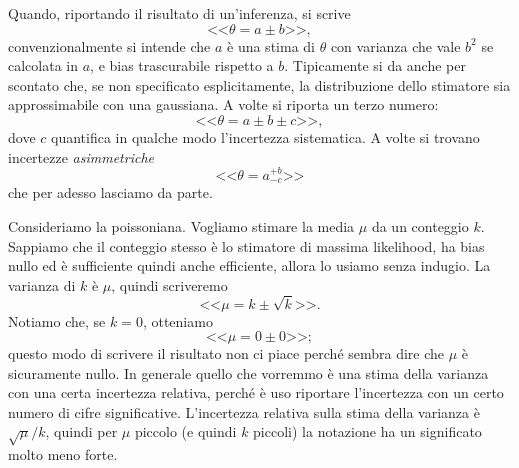 
Quando, riportando il risultato di un'inferenza, si scrive
\begin{equation*}
	\text{<<}\theta = a \pm b\text{>>},
\end{equation*}
convenzionalmente si intende che $a$ è una stima di $\theta$ con varianza che vale $b^2$ se calcolata in $a$,
e bias trascurabile rispetto a $b$.
Tipicamente si da anche per scontato che,
se non specificato esplicitamente,
la distribuzione dello stimatore sia approssimabile con una gaussiana.
A volte si riporta un terzo numero:
\begin{equation*}
	\text{<<}\theta = a \pm b \pm c\text{>>},
\end{equation*}
dove $c$ quantifica in qualche modo l'incertezza sistematica.
A volte si trovano incertezze \emph{asimmetriche}
\begin{equation*}
	\text{<<}\theta = a^{+b}_{-c}\text{>>}
\end{equation*}
che per adesso lasciamo da parte.

\begin{example}
	Consideriamo la poissoniana.
	Vogliamo stimare la media $\mu$ da un conteggio $k$.
	Sappiamo che il conteggio stesso è lo stimatore di massima likelihood,
	ha bias nullo ed è sufficiente quindi anche efficiente,
	allora lo usiamo senza indugio.
	La varianza di $k$ è $\mu$,
	quindi scriveremo
	\begin{equation*}
		\text{<<}\mu = k \pm \sqrt k\text{>>}.
	\end{equation*}
	Notiamo che, se $k=0$, otteniamo
	\begin{equation*}
		\text{<<}\mu = 0 \pm 0\text{>>};
	\end{equation*}
	questo modo di scrivere il risultato non ci piace perché sembra dire che $\mu$ è sicuramente nullo.
	In generale quello che vorremmo è una stima della varianza con una certa incertezza relativa,
	perché è uso riportare l'incertezza con un certo numero di cifre significative.
	L'incertezza relativa sulla stima della varianza è $\sqrt\mu / k$,
	quindi per $\mu$ piccolo (e quindi $k$ piccoli) la notazione ha un significato molto meno forte.
\end{example}

